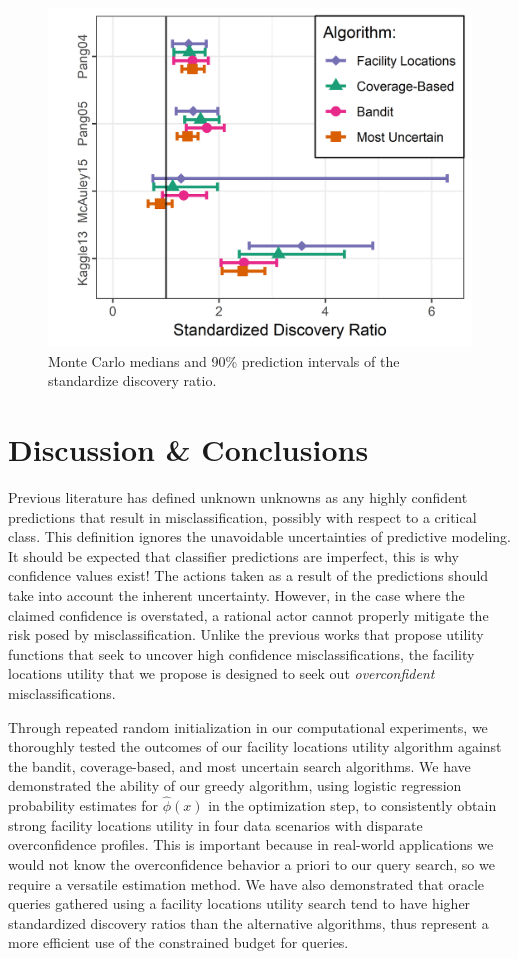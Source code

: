 \documentclass[conference]{IEEEtran}
\begin{document}
\begin{figure}[hbtp]
  \includegraphics[width=.49\textwidth]{discoveryRatioNarrow.png}
  \caption{Monte Carlo medians and 90\% prediction intervals of the standardize discovery ratio.}
  \label{fig:sdr}
\end{figure}

\section{Discussion \& Conclusions}

Previous literature has defined unknown unknowns as any highly confident predictions that result in misclassification, possibly with respect to a critical class. This definition ignores the unavoidable uncertainties of predictive modeling. It should be expected that classifier predictions are imperfect, this is why confidence values exist! The actions taken as a result of the predictions should take into account the inherent uncertainty. However, in the case where the claimed confidence is overstated, a rational actor cannot properly mitigate the risk posed by misclassification. Unlike the previous works that propose utility functions that seek to uncover high confidence misclassifications, the facility locations utility that we propose is designed to seek out \textit{overconfident} misclassifications. 

Through repeated random initialization in our computational experiments, we thoroughly tested the outcomes of our facility locations utility algorithm against the bandit, coverage-based, and most uncertain search algorithms. We have demonstrated the ability of our greedy algorithm, using logistic regression probability estimates for $\hat{\phi}(x)$ in the optimization step, to consistently obtain strong facility locations utility in four data scenarios with disparate overconfidence profiles. This is important because in real-world applications we would not know the overconfidence behavior a priori to our query search, so we require a versatile estimation method. We have also demonstrated that oracle queries gathered using a facility locations utility search tend to have higher standardized discovery ratios than the alternative algorithms, thus represent a more efficient use of the constrained budget for queries. 
\end{document}
